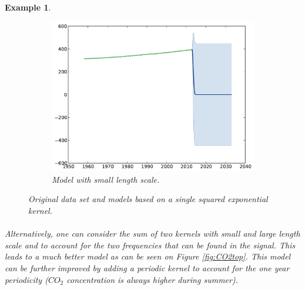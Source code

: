 \documentclass[twoside,openright]{report}
\newtheorem{example}{Example}
\begin{document}
\begin{example}
\begin{figure}[ht!]
        \begin{subfigure}[t]{0.30\textwidth}
                \includegraphics[width=\textwidth]{figures/python/CO2-rbfa}
                \caption{Model with small length scale.}
        \end{subfigure}
        \caption{Original data set and models based on a single squared exponential kernel.}
        \label{fig:CO2}
	\end{figure}

	\paragraph{}
	Alternatively, one can consider the sum of two kernels with small and large length scale and to account for the two frequencies that can be found in the signal. This leads to a much better model as can be seen on Figure \ref{fig:CO2top}. This model can be further improved by adding a periodic kernel to account for the one year periodicity ($CO_2$ concentration is always higher during summer).


\end{example}
\end{document}
